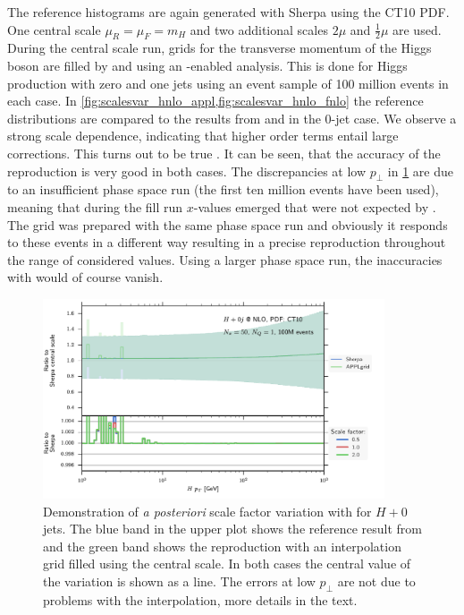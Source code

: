 The reference histograms are again generated with Sherpa using the CT10 PDF.
One central scale $\mu_R = \mu_F = m_H$ and two additional scales $2 \mu$ and $\frac{1}{2} \mu$ are used.
During the central scale run, grids for the transverse momentum of the Higgs boson are filled by \appl{} and \fnlo{} using an \mcgrid{}-enabled \rivet{} analysis.
This is done for Higgs production with zero and one jets using an event sample of 100 million events in each case.
In \cref{fig:scalesvar_hnlo_appl,fig:scalesvar_hnlo_fnlo} the reference distributions are compared to the results from \appl{} and \fnlo{} in the 0-jet case.
We observe a strong scale dependence, indicating that higher order terms entail large corrections.
This turns out to be true \cite{gfusionnnlo1,gfusionnnlo2}.
It can be seen, that the accuracy of the reproduction is very good in both cases.
The discrepancies at low $p_\perp$ in \cref{fig:scalesvar_hnlo_appl} are due to an insufficient phase space run (the first ten million events have been used), meaning that during the fill run $x$-values emerged that were not expected by \appl{}.
The \fnlo{} grid was prepared with the same phase space run and obviously it responds to these events in a different way resulting in a precise reproduction throughout the range of considered values.
Using a larger phase space run, the inaccuracies with \appl{} would of course vanish.
%
\begin{figure}
	\centering
	\includegraphics[width=0.9\textwidth]{images/scalesvar_hnlo_appl.pdf}
	\caption{Demonstration of \textit{a posteriori} scale factor variation with \appl{} for $H + 0$ jets.
			The blue band in the upper plot shows the reference result from \sherpa{} and the green band shows the reproduction with an interpolation grid filled using the central scale.
			In both cases the central value of the variation is shown as a line.
			The errors at low $p_\perp$ are not due to problems with the interpolation, more details in the text.}
	\label{fig:scalesvar_hnlo_appl}
\end{figure}
